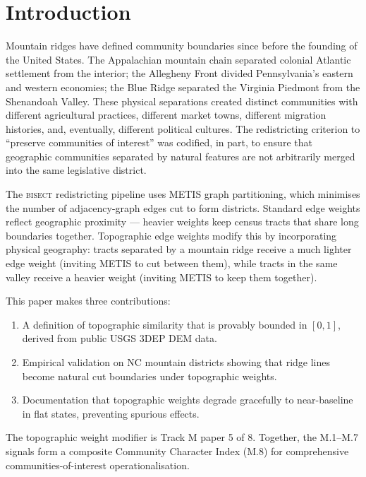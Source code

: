 \section{Introduction}

Mountain ridges have defined community boundaries since before the founding of the United States. The Appalachian mountain chain separated colonial Atlantic settlement from the interior; the Allegheny Front divided Pennsylvania's eastern and western economies; the Blue Ridge separated the Virginia Piedmont from the Shenandoah Valley. These physical separations created distinct communities with different agricultural practices, different market towns, different migration histories, and, eventually, different political cultures. The redistricting criterion to ``preserve communities of interest'' was codified, in part, to ensure that geographic communities separated by natural features are not arbitrarily merged into the same legislative district.

The \textsc{bisect} redistricting pipeline uses METIS graph partitioning, which minimises the number of adjacency-graph edges cut to form districts. Standard edge weights reflect geographic proximity — heavier weights keep census tracts that share long boundaries together. Topographic edge weights modify this by incorporating physical geography: tracts separated by a mountain ridge receive a much lighter edge weight (inviting METIS to cut between them), while tracts in the same valley receive a heavier weight (inviting METIS to keep them together).

This paper makes three contributions:

\begin{enumerate}
  \item A definition of topographic similarity that is provably bounded in $[0,1]$, derived from public USGS 3DEP DEM data.
  \item Empirical validation on NC mountain districts showing that ridge lines become natural cut boundaries under topographic weights.
  \item Documentation that topographic weights degrade gracefully to near-baseline in flat states, preventing spurious effects.
\end{enumerate}

The topographic weight modifier is Track M paper 5 of 8. Together, the M.1--M.7 signals form a composite Community Character Index (M.8) for comprehensive communities-of-interest operationalisation.
